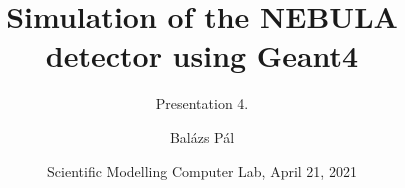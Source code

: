 \title[Geant4]
{Simulation of the NEBULA detector using Geant4}

\subtitle{Presentation 4.}

\author[Balázs Pál]
{Balázs Pál}


\date[ELTE 2021]
{Scientific Modelling Computer Lab, April 21, 2021}

